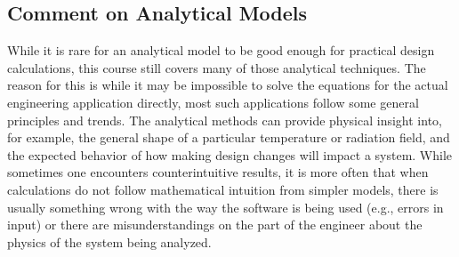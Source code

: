 \subsection{Comment on Analytical Models}

While it is rare for an analytical model to be good enough for practical design calculations, this course still covers many of those analytical techniques. The reason for this is while it may be impossible to solve the equations for the actual engineering application directly, most such applications follow some general principles and trends. The analytical methods can provide physical insight into, for example, the general shape of a particular temperature or radiation field, and the expected behavior of how making design changes will impact a system. While sometimes one encounters counterintuitive results, it is more often that when calculations do not follow mathematical intuition from simpler models, there is usually something wrong with the way the software is being used (e.g., errors in input) or there are misunderstandings on the part of the engineer about the physics of the system being analyzed.

